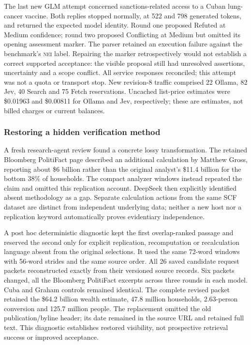 \documentclass[conference]{IEEEtran}
\newcommand{\NEI}{\textsc{nei}}
\newcommand{\pct}{\%}
\begin{document}
The last new GLM attempt concerned sanctions-related access to a Cuban lung-cancer vaccine. Both replies stopped normally, at 522 and 798 generated tokens, and returned the expected model identity. Round one proposed Refuted at Medium confidence; round two proposed Conflicting at Medium but omitted its opening assessment marker. The parser retained an execution failure against the benchmark's \NEI{} label. Repairing the marker retrospectively would not establish a correct supported acceptance: the visible proposal still had unresolved assertions, uncertainty and a scope conflict. All service responses reconciled; this attempt was not a quota or transport stop. New revision-8 traffic comprised 22 Ollama, 82 Jev, 40 Search and 75 Fetch reservations. Uncached list-price estimates were \$0.01963 and \$0.00811 for Ollama and Jev, respectively; these are estimates, not billed charges or current balances.

\subsubsection{Restoring a hidden verification method}
A fresh research-agent review found a concrete lossy transformation. The retained Bloomberg PolitiFact page described an additional calculation by Matthew Gross, reporting about \$6 billion rather than the original analyst's \$11.4 billion for the bottom 38\pct{} of households. The compact analyzer windows instead repeated the claim and omitted this replication account. DeepSeek then explicitly identified absent methodology as a gap. Separate calculation actions from the same SCF dataset are distinct from independent underlying data; neither a new host nor a replication keyword automatically proves evidentiary independence.

A post hoc deterministic diagnostic kept the first overlap-ranked passage and reserved the second only for explicit replication, recomputation or recalculation language absent from the original selections. It used the same 72-word windows with 56-word strides and the same source order. All 26 saved candidate request packets reconstructed exactly from their versioned source records. Six packets changed, all the Bloomberg PolitiFact excerpts across three rounds in each model. Cuba and Graham controls remained identical. The complete revised packet retained the \$64.2 billion wealth estimate, 47.8 million households, 2.63-person conversion and 125.7 million people. The replacement omitted the old publication/byline header; its date remained in the source URL and retained full text. This diagnostic establishes restored visibility, not prospective retrieval success or improved acceptance.
\end{document}
